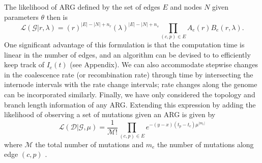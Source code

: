 \documentclass{article}
\newcommand{\comment}[1]{{\it \color{orange} (#1)}}
\begin{document}

The likelihood of ARG defined by the set of edges $E$ and nodes $N$
given parameters $\theta$ then is
\begin{equation}\label{eq:full-lik}
    \mathcal{L}(\mathcal{G}|r, \lambda)
    =
    (r)^{|E|-|N|+n_r} (\lambda)^{|E|-|N|+n_s} \prod_{(c, p) \in E} A_e(r) B_e(r, \lambda) .
\end{equation}
One significant advantage of this formulation is that the computation time
is linear in the number of edges, and an algorithm can be devised to 
to efficiently keep track of $I_e(t)$ (see Appendix).
We can also accommodate stepwise changes in the 
coalescence rate (or recombination rate)
through time by intersecting the internode intervals with the rate change
intervals; rate changes along the genome can be incorporated similarly.
Finally, we have only considered the topology and branch length information of any ARG.
Extending this expression by adding the likelihood of observing a set of mutations
given an ARG is given by
\begin{equation}\label{eq:lik-mut}
    \mathcal{L}(\mathcal{D}|\mathcal{G}, \mu)
    =
    \frac{1}{\mathcal{M}!} \prod_{(c, p) \in E} e^{-(y-x)(t_p-t_c)\mu^{|m_e|}}
\end{equation}
where $\mathcal{M}$ the total number of mutations and $m_e$
the number of mutations along edge $(c,p)$ \citep{mahmoudi_bayesian_2022}.
\end{document}
